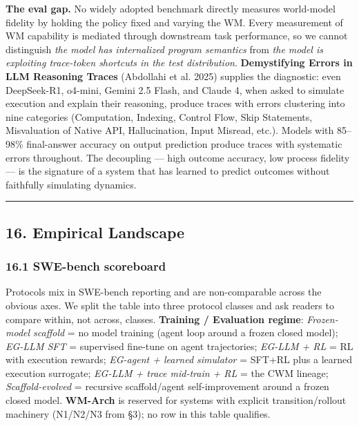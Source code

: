 \documentclass{article}
\begin{document}
\textbf{The eval gap.} No widely adopted benchmark directly measures
world-model fidelity by holding the policy fixed and varying the WM.
Every measurement of WM capability is mediated through downstream task
performance, so we cannot distinguish \emph{the model has internalized
program semantics} from \emph{the model is exploiting trace-token
shortcuts in the test distribution}. \textbf{Demystifying Errors in LLM
Reasoning Traces} (Abdollahi et al. 2025) supplies the diagnostic: even
DeepSeek-R1, o4-mini, Gemini 2.5 Flash, and Claude 4, when asked to
simulate execution and explain their reasoning, produce traces with
errors clustering into nine categories (Computation, Indexing, Control
Flow, Skip Statements, Misvaluation of Native API, Hallucination, Input
Misread, etc.). Models with 85--98\% final-answer accuracy on output
prediction produce traces with systematic errors throughout. The
decoupling --- high outcome accuracy, low process fidelity --- is the
signature of a system that has learned to predict outcomes without
faithfully simulating dynamics.

\begin{center}\rule{0.5\linewidth}{0.5pt}\end{center}

\hypertarget{empirical-landscape}{%
\subsection{16. Empirical Landscape}\label{empirical-landscape}}

\hypertarget{swe-bench-scoreboard}{%
\subsubsection{16.1 SWE-bench scoreboard}\label{swe-bench-scoreboard}}

Protocols mix in SWE-bench reporting and are non-comparable across the
obvious axes. We split the table into three protocol classes and ask
readers to compare within, not across, classes. \textbf{Training /
Evaluation regime}: \emph{Frozen-model scaffold} = no model training
(agent loop around a frozen closed model); \emph{EG-LLM SFT} =
supervised fine-tune on agent trajectories; \emph{EG-LLM + RL} = RL with
execution rewards; \emph{EG-agent + learned simulator} = SFT+RL plus a
learned execution surrogate; \emph{EG-LLM + trace mid-train + RL} = the
CWM lineage; \emph{Scaffold-evolved} = recursive scaffold/agent
self-improvement around a frozen closed model. \textbf{WM-Arch} is
reserved for systems with explicit transition/rollout machinery
(N1/N2/N3 from §3); no row in this table qualifies.
\end{document}
